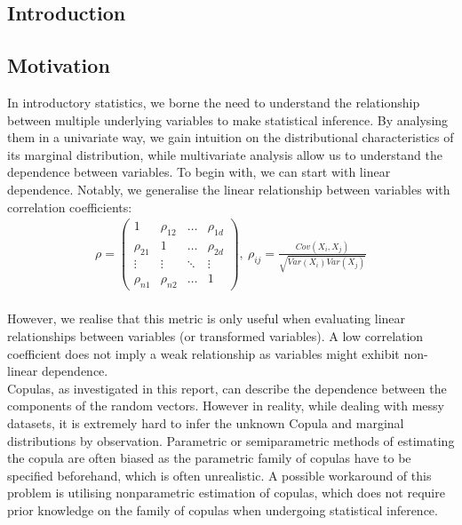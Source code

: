 \documentclass[12pt]{report}
\newcommand{\1}{\mathbf{1}}
\begin{document}
\tableofcontents
\renewcommand\thesection{\arabic{section}}

\newpage
\begin{flushleft}
\sectionfont{\fontsize{20}{15}\selectfont}
\subsectionfont{\fontsize{17}{15}\selectfont}
\section{Introduction}
\vspace{0.5cm}
\subsection{Motivation}
\vspace{0.5cm}
\normalsize
In introductory statistics, we borne the need to understand the relationship between multiple underlying variables to make statistical inference. By analysing them in a univariate way, we gain intuition on the distributional characteristics of its marginal distribution, while multivariate analysis allow us to understand the dependence between variables. To begin with, we can start with linear dependence. Notably, we generalise the linear relationship between variables with correlation coefficients: \\
\vspace{0.5cm}
\begin{align*}
\rho = \begin{pmatrix} 
    1 & \rho_{12} & \dots & \rho_{1d} \\
    \rho_{21} & 1 & \dots & \rho_{2d} \\
    \vdots & \vdots & \ddots & \vdots \\
    \rho_{n1} & \rho_{n2} & \dots & 1
\end{pmatrix}
, \: \rho_{ij} = \frac{Cov(X_{i},X_{j})}{\sqrt{Var(X_{i})Var(X_{j})}}
\end{align*} \\
\vspace{0.5cm}
However, we realise that this metric is only useful when evaluating linear relationships between variables (or transformed variables). A low correlation coefficient does not imply a weak relationship as variables might exhibit non-linear dependence. \\
\vspace{0.5cm}
Copulas, as investigated in this report, can describe the dependence between the components of the random vectors. However in reality, while dealing with messy datasets, it is extremely hard to infer the unknown Copula and marginal distributions by observation. Parametric or semiparametric methods of estimating the copula are often biased as the parametric family of copulas have to be specified beforehand, which is often unrealistic. A possible workaround of this problem is utilising nonparametric estimation of copulas, which does not require prior knowledge on the family of copulas when undergoing statistical inference. \\

\end{flushleft}
\end{document}
